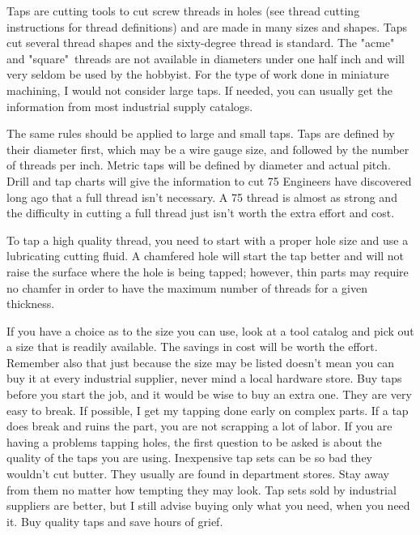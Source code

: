 
Taps are cutting tools to cut screw threads in holes (see thread cutting
instructions for thread definitions) and are made in many sizes and shapes. Taps
cut several thread shapes and the sixty-degree thread is standard. The "acme"
and "square"\ threads are not available in diameters under one half inch and will
very seldom be used by the hobbyist. For the type of work done in miniature
machining, I would not consider large taps. If needed, you can usually get the
information from most industrial supply catalogs.

The same rules should be applied to large and small taps. Taps are defined by
their diameter first, which may be a wire gauge size, and followed by the number
of threads per inch. Metric taps will be defined by diameter and actual pitch.
Drill and tap charts will give the information to cut 75%
Engineers have discovered long ago that a full thread isn't necessary. A 75%
thread is almost as strong and the difficulty in cutting a full thread just
isn't worth the extra effort and cost.

To tap a high quality thread, you need to start with a proper hole size and use
a lubricating cutting fluid. A chamfered hole will start the tap better and will
not raise the surface where the hole is being tapped; however, thin parts may
require no chamfer in order to have the maximum number of threads for a given
thickness.


If you have a choice as to the size you can use, look at a tool catalog and pick
out a size that is readily available. The savings in cost will be worth the
effort. Remember also that just because the size may be listed doesn't mean you
can buy it at every industrial supplier, never mind a local hardware store. Buy
taps before you start the job, and it would be wise to buy an extra one. They
are very easy to break. If possible, I get my tapping done early on complex
parts. If a tap does break and ruins the part, you are not scrapping a lot of
labor. If you are having a problems tapping holes, the first question to be
asked is about the quality of the taps you are using. Inexpensive tap sets can
be so bad they wouldn't cut butter. They usually are found in department stores.
Stay away from them no matter how tempting they may look. Tap sets sold by
industrial suppliers are better, but I still advise buying only what you need,
when you need it. Buy quality taps and save hours of grief.

